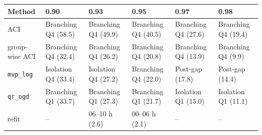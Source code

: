 \begin{tabular}{@{}llllll@{}}
\toprule
Method & 0.90 & 0.93 & 0.95 & 0.97 & 0.98 \\
\midrule
ACI & Branching Q4 (58.5) & Branching Q4 (49.9) & Branching Q4 (40.5) & Branching Q4 (27.6) & Branching Q4 (19.4) \\
group-wise ACI & Branching Q4 (32.4) & Branching Q4 (26.2) & Branching Q4 (20.8) & Branching Q4 (13.9) & Branching Q4 (9.9) \\
\texttt{mvp\_log} & Isolation Q4 (33.4) & Isolation Q4 (27.2) & Branching Q4 (22.0) & Post-gap (17.8) & Post-gap (14.4) \\
\texttt{qr\_ogd} & Branching Q1 (33.7) & Branching Q1 (27.3) & Branching Q1 (21.7) & Isolation Q1 (15.0) & Isolation Q1 (11.1) \\
refit & -- & 06--10 h (2.6) & 00--06 h (2.1) & -- & -- \\
\bottomrule
\end{tabular}
